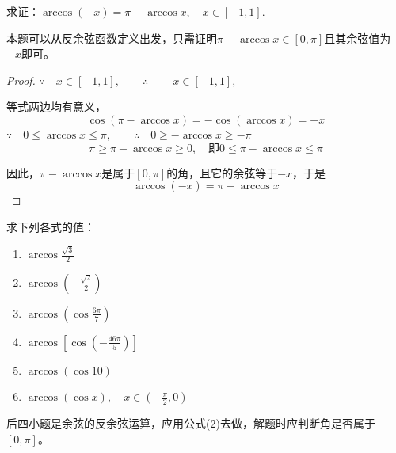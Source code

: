 \begin{example}
    求证：$\arccos(-x)=\pi-\arccos x,\quad x\in [-1,1]$.
\end{example}

\begin{analyze}
    本题可以从反余弦函数定义出发，只需证明$π-\arccos x\in[0,\pi]$且其余弦值为$-x$即可。
\end{analyze}

\begin{proof}
   $\because\quad  x\in [-1,1],\qquad \therefore\quad -x\in [-1,1]$,

等式两边均有意义，
\[\cos(\pi-\arccos x)=-\cos(\arccos x)=-x\]
$\because\quad 0\le \arccos x\le \pi, \qquad \therefore\quad 0\ge -\arccos x\ge -\pi$
\[\pi\ge \pi-\arccos x\ge 0,\quad \text{即} 0\le \pi-\arccos x\le \pi\]

因此，$\pi-\arccos x$是属于$[0,\pi]$的角，且它的余弦等于$-x$，于是
\[\arccos(-x)=\pi-\arccos x\]
\end{proof}

\begin{example}
    求下列各式的值：
\begin{multicols}{2}
\begin{enumerate}[(1)]
    \item $\arccos \frac{\sqrt{3}}{2}$
    \item $\arccos \left(-\frac{\sqrt{2}}{2}\right)$
    \item $\arccos \left(\cos\frac{6\pi}{7}\right)$
    \item $\arccos \left[\cos\left(-\frac{46\pi}{5}\right)\right]$
    \item $\arccos (\cos 10)$
    \item $\arccos (\cos x),\quad x\in\left(-\frac{\pi}{2},0\right)$
\end{enumerate}
\end{multicols}
 \end{example}   


\begin{analyze}
后四小题是余弦的反余弦运算，应用公式(2)去做，解题时应判断角是否属于$[0,\pi]$。
\end{analyze}


